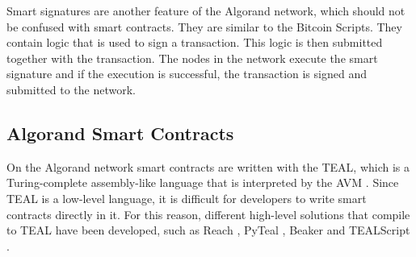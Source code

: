 Smart signatures are another feature of the Algorand network, which should not be confused with smart contracts. They are similar to the Bitcoin Scripts. They contain logic that is used to sign a transaction. This logic is then submitted together with the transaction.
The nodes in the network execute the smart signature and if the execution is successful, the transaction is signed and submitted to the network.

\subsection*{Algorand Smart Contracts} \label{section:algorand-smartcontracts}
On the Algorand network smart contracts are written with the \ac{TEAL}, which is a Turing-complete assembly-like language that is interpreted by the \ac{AVM} \cite{noauthor_introduction_nodate}.
Since \ac{TEAL} is a low-level language, it is difficult for developers to write smart contracts directly in it.
For this reason, different high-level solutions that compile to \ac{TEAL} have been developed, such as Reach \cite{noauthor_reach_nodate}, PyTeal \cite{noauthor_pyteal_nodate}, Beaker \cite{noauthor_beaker_nodate} and TEALScript \cite{noauthor_algorandfoundationtealscript_nodate}.


